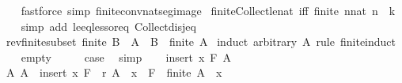 \begin{isabellebody}
%
\isadelimproof
\ \ %
\endisadelimproof
%
\isatagproof
{}\isamarkupfalse%
\ {\isacharparenleft}{\kern0pt}fastforce\ simp{\isacharcolon}{\kern0pt}\ finite{\isacharunderscore}{\kern0pt}conv{\isacharunderscore}{\kern0pt}nat{\isacharunderscore}{\kern0pt}seg{\isacharunderscore}{\kern0pt}image{\isacharparenright}{\kern0pt}%
\endisatagproof
{\isafoldproof}%
%
\isadelimproof
\isanewline
%
\endisadelimproof
\isanewline
{}\isamarkupfalse%
\ finite{\isacharunderscore}{\kern0pt}Collect{\isacharunderscore}{\kern0pt}le{\isacharunderscore}{\kern0pt}nat\ {\isacharbrackleft}{\kern0pt}iff{\isacharbrackright}{\kern0pt}{\isacharcolon}{\kern0pt}\ {\isachardoublequoteopen}finite\ {\isacharbraceleft}{\kern0pt}n{\isacharcolon}{\kern0pt}{\isacharcolon}{\kern0pt}nat{\isachardot}{\kern0pt}\ n\ {\isasymle}\ k{\isacharbraceright}{\kern0pt}{\isachardoublequoteclose}\isanewline
%
\isadelimproof
\ \ %
\endisadelimproof
%
\isatagproof
{}\isamarkupfalse%
\ {\isacharparenleft}{\kern0pt}simp\ add{\isacharcolon}{\kern0pt}\ le{\isacharunderscore}{\kern0pt}eq{\isacharunderscore}{\kern0pt}less{\isacharunderscore}{\kern0pt}or{\isacharunderscore}{\kern0pt}eq\ Collect{\isacharunderscore}{\kern0pt}disj{\isacharunderscore}{\kern0pt}eq{\isacharparenright}{\kern0pt}%
\endisatagproof
{\isafoldproof}%
%
\isadelimproof
%
\endisadelimproof
%
\isadelimdocument
%
\endisadelimdocument
%
\isatagdocument
%
\isamarkuptrue%
%
\endisatagdocument
{\isafolddocument}%
%
\isadelimdocument
%
\endisadelimdocument
{}\isamarkupfalse%
\ rev{\isacharunderscore}{\kern0pt}finite{\isacharunderscore}{\kern0pt}subset{\isacharcolon}{\kern0pt}\ {\isachardoublequoteopen}finite\ B\ {\isasymLongrightarrow}\ A\ {\isasymsubseteq}\ B\ {\isasymLongrightarrow}\ finite\ A{\isachardoublequoteclose}\isanewline
%
\isadelimproof
%
\endisadelimproof
%
\isatagproof
{}\isamarkupfalse%
\ {\isacharparenleft}{\kern0pt}induct\ arbitrary{\isacharcolon}{\kern0pt}\ A\ rule{\isacharcolon}{\kern0pt}\ finite{\isacharunderscore}{\kern0pt}induct{\isacharparenright}{\kern0pt}\isanewline
\ \ \isamarkupfalse%
\ empty\isanewline
\ \ \isamarkupfalse%
\ \isamarkupfalse%
\ {\isacharquery}{\kern0pt}case\ \isamarkupfalse%
\ simp\isanewline
{}\isamarkupfalse%
\isanewline
\ \ \isamarkupfalse%
\ {\isacharparenleft}{\kern0pt}insert\ x\ F\ A{\isacharparenright}{\kern0pt}\isanewline
\ \ \isamarkupfalse%
\ A{\isacharcolon}{\kern0pt}\ {\isachardoublequoteopen}A\ {\isasymsubseteq}\ insert\ x\ F{\isachardoublequoteclose}\ \ r{\isacharcolon}{\kern0pt}\ {\isachardoublequoteopen}A\ {\isacharminus}{\kern0pt}\ {\isacharbraceleft}{\kern0pt}x{\isacharbraceright}{\kern0pt}\ {\isasymsubseteq}\ F\ {\isasymLongrightarrow}\ finite\ {\isacharparenleft}{\kern0pt}A\ {\isacharminus}{\kern0pt}\ {\isacharbraceleft}{\kern0pt}x{\isacharbraceright}{\kern0pt}{\isacharparenright}{\kern0pt}{\isachardoublequoteclose}\isanewline

\end{isabellebody}
